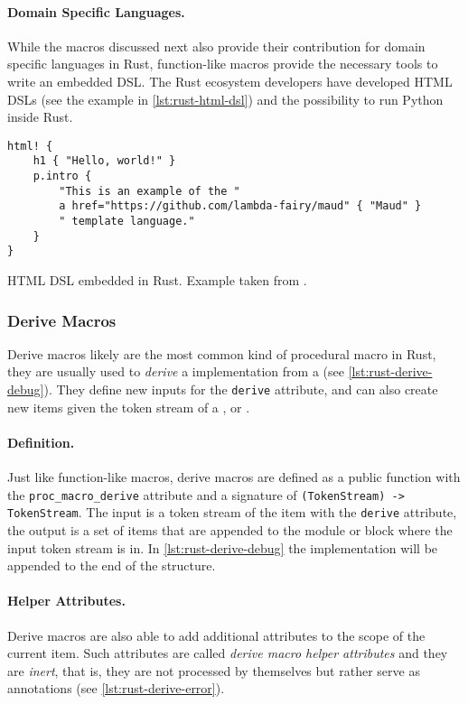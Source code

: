 \paragraph{Domain Specific Languages.}
While the macros discussed next also provide their contribution for domain specific languages in Rust,
function-like macros provide the necessary tools to write an embedded DSL.
The Rust ecosystem developers have developed HTML DSLs \autocite{Wong2021, Stokke2021}
(see the example in \autoref{lst:rust-html-dsl}) and
the possibility to run Python inside Rust\autocite{Fusion2021}.

\begin{listing}
    \begin{verbatim}
html! {
    h1 { "Hello, world!" }
    p.intro {
        "This is an example of the "
        a href="https://github.com/lambda-fairy/maud" { "Maud" }
        " template language."
    }
}
    \end{verbatim}
    \caption{HTML DSL embedded in Rust. Example taken from \autocite{Wong2021}.}
    \label{lst:rust-html-dsl}
\end{listing}

\subsubsection*{Derive Macros}\label{sec:rust-macros:proc:derive}
Derive macros likely are the most common kind of procedural macro in Rust,
they are usually used to \emph{derive} a  implementation from a  (see \autoref{lst:rust-derive-debug}).
They define new inputs for the \texttt{derive} attribute,
and can also create new items given the token stream of a ,  or .

\paragraph{Definition.}
Just like function-like macros,
derive macros are defined as a public function with the \texttt{proc\_macro\_derive} attribute
and a signature of \texttt{(TokenStream) -> TokenStream}.
The input is a token stream of the item with the \texttt{derive} attribute,
the output is a set of items that are appended to the module or block where the input token stream is in.
In \autoref{lst:rust-derive-debug} the  implementation will be appended to the end of the structure.

\paragraph{Helper Attributes.}
Derive macros are also able to add additional attributes to the scope of the current item.
Such attributes are called \emph{derive macro helper attributes} and they are \emph{inert},
that is, they are not processed by themselves but rather serve as annotations (see \autoref{lst:rust-derive-error}).

